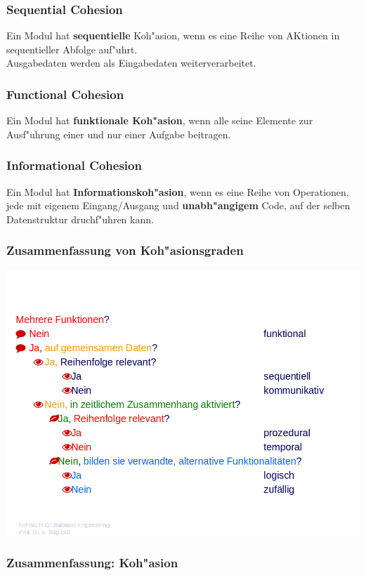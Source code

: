 \subsubsection{Sequential Cohesion}
Ein Modul hat \textbf{sequentielle} Koh"asion, wenn es eine Reihe von AKtionen in sequentieller Abfolge auf"uhrt.\\
Ausgabedaten werden als Eingabedaten weiterverarbeitet.

\subsubsection{Functional Cohesion}
Ein Modul hat \textbf{funktionale Koh"asion}, wenn alle seine Elemente zur Ausf"uhrung einer und nur einer Aufgabe beitragen.

\subsubsection{Informational Cohesion}
Ein Modul hat \textbf{Informationskoh"asion}, wenn es eine Reihe von Operationen, jede mit eigenem Eingang/Ausgang und \textbf{unabh"angigem} Code, auf der selben Datenstruktur druchf"uhren kann.

\subsubsection{Zusammenfassung von Koh"asionsgraden}

\includegraphics[scale=0.5]{inc/Softwareentwurf/ZusammenfassungKohaesionsgrade.png}

\subsubsection{Zusammenfassung: Koh"asion}


